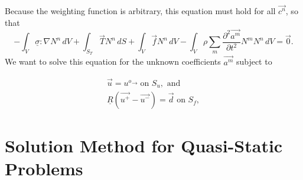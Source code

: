  Because the weighting function is arbitrary, this equation must hold
for all $\overrightarrow{c^{n}}$, so that
\begin{equation}
-\int_{V}\underline{\sigma}:\nabla N^{n}\, dV+\int_{S_{T}}\vec{T}N^{n}\, dS+\int_{V}\vec{f}N^{n}\, dV-\int_{V}\rho\sum_{m}\frac{\partial^{2}\overrightarrow{a^{m}}}{\partial t^{2}}N^{m}N^{n}\, dV=\vec{0}.
\end{equation}
We want to solve this equation for the unknown coefficients $\overrightarrow{a^{m}}$
subject to

\begin{gather}
\vec{u}=u^{o}\overrightarrow{}\text{ on }S_{u},\text{ and}\\
\underline{R}(\overrightarrow{u^{+}}-\overrightarrow{u^{-}})=\vec{d}\text{ on }S_{f},
\end{gather}



\section{Solution Method for Quasi-Static Problems}

